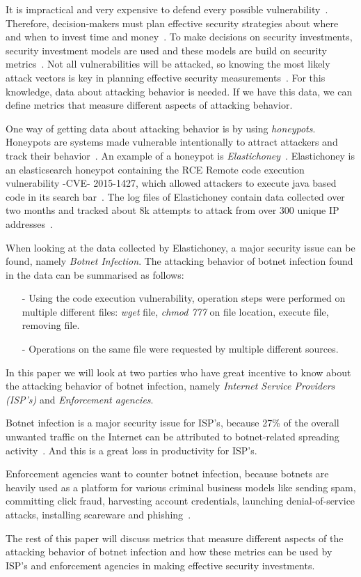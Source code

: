 \label{cap:sec1}

It is impractical and very expensive to defend every possible vulnerability~\cite{TARA}. Therefore, decision-makers must plan effective security strategies about where and when to invest time and money~\cite{ROSI}. To make decisions on security investments, security investment models are used and these models are build on security metrics~\cite{BR2010}. Not all vulnerabilities will be attacked, so knowing the most likely attack vectors is key in planning effective security measurements~\cite{TARA}. For this knowledge, data about attacking behavior is needed. If we have this data, we can define metrics that measure different aspects of attacking behavior.

One way of getting data about attacking behavior is by using \textit{honeypots}. Honeypots are systems made vulnerable intentionally to attract attackers and track their behavior~\cite{WP2010}. An example of a honeypot is \textit{Elastichoney}~\cite{BR2010}. Elastichoney is an elasticsearch honeypot containing the RCE Remote code execution vulnerability -CVE- 2015-1427, which allowed attackers to execute java based code in its search bar~\cite{CVE}. The log files of Elastichoney contain data collected over two months and tracked about 8k attempts to attack from over 300 unique IP addresses~\cite{BR2010}.


When looking at the data collected by Elastichoney, a major security issue can be found, namely \textit{Botnet Infection}. The attacking behavior of botnet infection found in the data can be summarised as follows:
\begin{itemize}
\item[-] Using the code execution vulnerability, operation steps were performed on multiple different files: \textit{wget} file, \textit{chmod 777} on file location, execute file, removing file.
\item[-] Operations on the same file were requested by multiple different sources.
\end{itemize}
In this paper we will look at two parties who have great incentive to know about the attacking behavior of botnet infection, namely \textit{Internet Service Providers (ISP's)} and \textit{Enforcement agencies}.

Botnet infection is a major security issue for ISP's, because 27\% of the overall unwanted traffic on the Internet can be attributed to botnet-related spreading activity~\cite{AM2006}. And this is a great loss in productivity for ISP's.

Enforcement agencies want to counter botnet infection, because botnets are heavily used as a platform for various criminal business models like sending spam, committing click fraud, harvesting account credentials, launching denial-of-service attacks, installing scareware and phishing~\cite{AR2013}.

The rest of this paper will discuss metrics that measure different aspects of the attacking behavior of botnet infection and how these metrics can be used by ISP's and enforcement agencies in making effective security investments.

